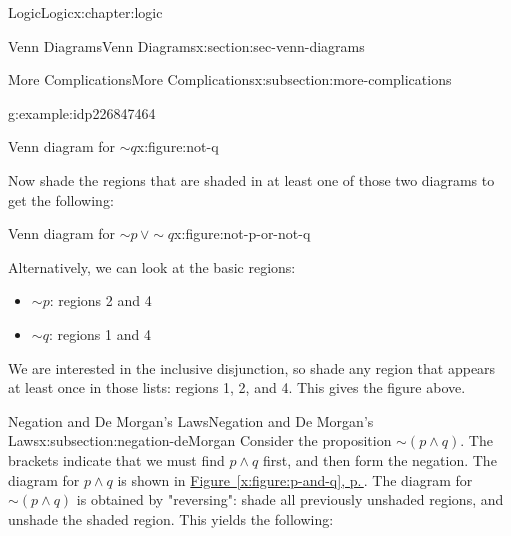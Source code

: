 \documentclass[twoside,10pt,]{book}
\newcommand{\xreffont}{\relax}
\numberwithin{equation}{section}
\begin{document}
\begin{chapterptx}{Logic}{}{Logic}{}{}{x:chapter:logic}
\begin{sectionptx}{Venn Diagrams}{}{Venn Diagrams}{}{}{x:section:sec-venn-diagrams}
\begin{subsectionptx}{More Complications}{}{More Complications}{}{}{x:subsection:more-complications}
\begin{example}{}{g:example:idp226847464}
\par
\begin{figureptx}{Venn diagram for \(\sim\!{q}\)}{x:figure:not-q}{}%
\begin{image}{0.3}{0.4}{0.3}%
\resizebox{\linewidth}{!}{%
\begin{venndiagram2sets}[labelA={$p$},labelB={$q$}]
  \fillNotB
\end{venndiagram2sets}
}%
\end{image}%
\tcblower
\end{figureptx}%
%
\par
Now shade the regions that are shaded in at least one of those two diagrams to get the following:%
\par
\begin{figureptx}{Venn diagram for \(\sim\!{p}\,{\vee}\sim\!{q}\)}{x:figure:not-p-or-not-q}{}%
\begin{image}{0.3}{0.4}{0.3}%
\resizebox{\linewidth}{!}{%
\begin{venndiagram2sets}[labelA={$p$},labelB={$q$}]
  \fillNotAorNotB
\end{venndiagram2sets}
}%
\end{image}%
\tcblower
\end{figureptx}%
%
\par
Alternatively, we can look at the basic regions:%
\begin{itemize}[label=\textbullet]
\item{}\(\sim\!{p}\): regions 2 and 4%
\item{}\(\sim\!{q}\): regions 1 and 4%
\end{itemize}
We are interested in the inclusive disjunction, so shade any region that appears at least once in those lists: regions 1, 2, and 4.  This gives the figure above.%
\end{example}
\end{subsectionptx}
%
%
\typeout{************************************************}
\typeout{************************************************}
%
\begin{subsectionptx}{Negation and De Morgan's Laws}{}{Negation and De Morgan's Laws}{}{}{x:subsection:negation-deMorgan}
Consider the proposition \(\sim\!(p {\wedge} q)\).  The brackets indicate that we must find \(p {\wedge} q\) first, and then form the negation.  The diagram for \(p {\wedge} q\) is shown in \hyperref[x:figure:p-and-q]{Figure~{\xreffont\ref{x:figure:p-and-q}}, p.\,\pageref{x:figure:p-and-q}}.  The diagram for \(\sim\!(p {\wedge} q)\) is obtained by "reversing": shade all previously unshaded regions, and unshade the shaded region.  This yields the following:%

\end{subsectionptx}
\end{sectionptx}
\end{chapterptx}
\end{document}
